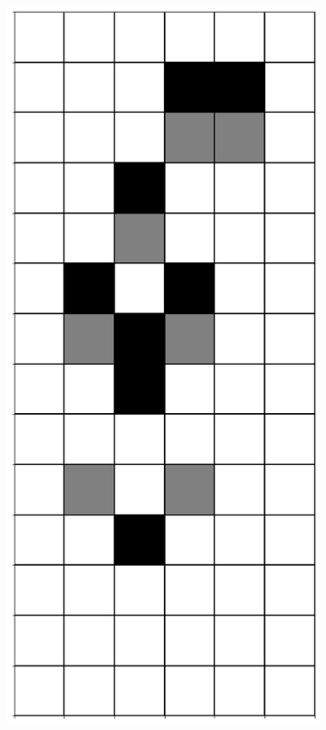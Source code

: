 \documentclass[12pt]{article}
\numberwithin{figure}{section} %
\begin{document}
\begin{figure}[H]
\begin{subfigure}{0.3\textwidth}
     \subcaption{}
   \end{subfigure}
        \begin{subfigure}{0.3\textwidth}
     \centering
     \includegraphics[angle=270,width=\linewidth]{Section4/7.2}

\end{subfigure}
\end{figure}
\end{document}
